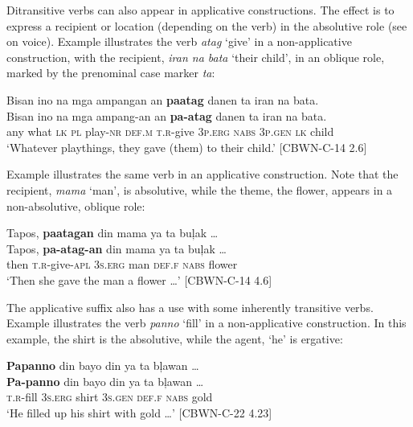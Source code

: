 Ditransitive verbs can also appear in applicative constructions. The effect is to express a recipient or location (depending on the verb) in the absolutive role (see  on voice). Example  illustrates the verb \textit{atag} ‘give’ in a non-applicative construction, with the recipient, \textit{iran na bata} ‘their child’, in an oblique role, marked by the prenominal case marker \textit{ta}:

\ea
\label{bkm:Ref396506191}
Bisan  ino  na  mga  ampangan  an  \textbf{paatag}  danen  ta  iran  na  bata. \\\smallskip
\gll Bisan  ino  na  mga  ampang-an  an  \textbf{pa-atag}  danen  ta  iran  na  bata. \\
any  what  \textsc{lk}  \textsc{pl}  play-\textsc{nr}  \textsc{def.m}  \textsc{t.r}-give  3\textsc{p.erg}  \textsc{nabs}  3\textsc{p.gen}  \textsc{lk}  child \\
\glt ‘Whatever playthings, they gave (them) to their child.’ [CBWN-C-14 2.6]
\z

Example  illustrates the same verb in an applicative construction. Note that the recipient, \textit{mama} ‘man’, is absolutive, while the theme, the flower, appears in a non-absolutive, oblique role:

\ea
\label{bkm:Ref395799832}
Tapos,  \textbf{paatagan}  din  mama  ya  ta  buļak … \\\smallskip
\gll Tapos,  \textbf{pa-atag-an}  din  mama  ya  ta  buļak … \\
then  \textsc{t.r}-give-\textsc{apl}  3\textsc{s.erg}  man  \textsc{def.f}  \textsc{nabs}  flower \\
\glt ‘Then she gave the man a flower …' [CBWN-C-14 4.6]
\z

The applicative suffix also has a  use with some inherently transitive verbs. Example  illustrates the verb \textit{panno} ‘fill’ in a non-applicative construction. In this example, the shirt is the absolutive, while the agent, ‘he’ is ergative:

\ea
\label{bkm:Ref123020654}
\textbf{Papanno}  din  bayo  din  ya  ta  bļawan … \\\smallskip
\gll \textbf{Pa-panno}  din  bayo  din  ya  ta  bļawan … \\
\textsc{t.r}-fill  3\textsc{s.erg}  shirt  3\textsc{s.gen}  \textsc{def.f}  \textsc{nabs}  gold \\
\glt ‘He filled up his shirt with gold …’ [CBWN-C-22 4.23]
\z

